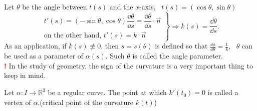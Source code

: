 Let $\theta$ be the angle between $t(s)$ and the $x$-axis, \ie\ $t(s)=(\cos \theta,\sin \theta)$
\[
    \left. \begin{array}{lll}
        t'(s)=(-\sin \theta,\cos \theta)\dfrac{\dd \theta}{\dd s}=
        \dfrac{\dd \theta}{\dd s}\cdot\vec{n} \\
        \text{on the other hand, }t'(s)=k\cdot\vec{n}
    \end{array}\right\}
    \Rightarrow \boxed{k(s)=\frac{\dd \theta}{\dd s}}
    .\]
As an application, if $k(s)\not\equiv 0$, then $s=s(\theta)$
is defined so that $\frac{\dd s}{\dd \theta}=\frac{1}{k}$,
\ie\ $\theta$ can be used as a parameter
of $\alpha(s)$. Such $\theta$ is called the angle parameter.\\
{\Large\textcolor{red}{\textbf{!}}} 
In the study of geometry, the sign of the curvature is a
very important thing to keep in mind.
\begin{definition}
    Let $\alpha\colon I\to \mathbb{R}^3$ be a regular curve. The point at
    which $k'(t_0)=0$ is called a vertex of $\alpha$.(critical point of
    the curvature $k(t)$)
\end{definition}
